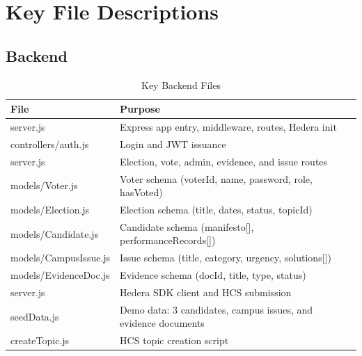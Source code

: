 \section{Key File Descriptions}
\label{sec:key-files}

\subsection{Backend}
\begin{table}[H]
\centering
\caption{Key Backend Files}
\label{tab:backend-files}
\begin{tabular}{@{}ll@{}}
\toprule
\textbf{File} & \textbf{Purpose} \\
\midrule
server.js & Express app entry, middleware, routes, Hedera init \\
controllers/auth.js & Login and JWT issuance \\
server.js & Election, vote, admin, evidence, and issue routes \\
models/Voter.js & Voter schema (voterId, name, password, role, hasVoted) \\
models/Election.js & Election schema (title, dates, status, topicId) \\
models/Candidate.js & Candidate schema (manifesto[], performanceRecords[]) \\
models/CampusIssue.js & Issue schema (title, category, urgency, solutions[]) \\
models/EvidenceDoc.js & Evidence schema (docId, title, type, status) \\
server.js & Hedera SDK client and HCS submission \\
seedData.js & Demo data: 3 candidates, campus issues, and evidence documents \\
createTopic.js & HCS topic creation script \\
\midrule
\end{tabular}
\end{table}

